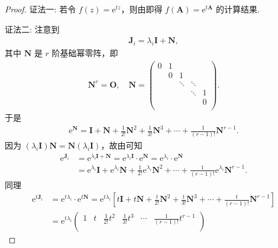 \documentclass[../../main.tex]{subfiles}
\begin{document}
\begin{proof}
{\color{blue}证法一:}
若令 $f(z)=\mathrm{e}^{tz}$，则由即得 $f(\boldsymbol{A}) = \mathrm{e}^{t\boldsymbol{A}}$ 的计算结果. 

{\color{blue}证法二:}
注意到
\begin{align*}
\boldsymbol{J}_i=\lambda_i\boldsymbol{I}+\boldsymbol{N},
\end{align*}
其中 $\boldsymbol{N}$ 是 $r$ 阶基础幂零阵，即
\begin{align*}
\boldsymbol{N}^r=\boldsymbol{O},\quad \boldsymbol{N}=\left( \begin{matrix}
0&		1&		&		&		\\
&		0&		1&		&		\\
&		&		\ddots&		\ddots&		\\
&		&		&		\ddots&		1\\
&		&		&		&		0\\
\end{matrix} \right) .
\end{align*}
于是
\begin{align*}
\mathrm{e}^{\boldsymbol{N}}=\boldsymbol{I}+\boldsymbol{N}+\frac{1}{2!}\boldsymbol{N}^2+\frac{1}{3!}\boldsymbol{N}^3+\cdots+\frac{1}{(r - 1)!}\boldsymbol{N}^{r - 1}.
\end{align*}
因为 $(\lambda_i\boldsymbol{I})\boldsymbol{N}=\boldsymbol{N}(\lambda_i\boldsymbol{I})$，故由可知
\begin{align*}
\mathrm{e}^{\boldsymbol{J}_i}&=\mathrm{e}^{\lambda_i\boldsymbol{I}+\boldsymbol{N}}=\mathrm{e}^{\lambda_i\boldsymbol{I}}\cdot\mathrm{e}^{\boldsymbol{N}}=\mathrm{e}^{\lambda_i}\cdot\mathrm{e}^{\boldsymbol{N}}\\
&=\mathrm{e}^{\lambda_i}\boldsymbol{I}+\mathrm{e}^{\lambda_i}\boldsymbol{N}+\frac{1}{2!}\mathrm{e}^{\lambda_i}\boldsymbol{N}^2+\cdots+\frac{1}{(r - 1)!}\mathrm{e}^{\lambda_i}\boldsymbol{N}^{r - 1}.
\end{align*}
同理
\begin{align*}
\mathrm{e}^{t\boldsymbol{J}_i}&=\mathrm{e}^{t\lambda_i}\cdot\mathrm{e}^{t\boldsymbol{N}}=\mathrm{e}^{t\lambda _i}\left[ t\boldsymbol{I}+t\boldsymbol{N}+\frac{t}{2!}\boldsymbol{N}^2+\frac{t}{3!}\boldsymbol{N}^3+\cdots +\frac{t}{(r-1)!}\boldsymbol{N}^{r-1} \right] 
\\
&=\mathrm{e}^{t\lambda_i}
\begin{pmatrix}
1 & t & \frac{1}{2!}t^2 & \frac{1}{3!}t^3 & \cdots & \frac{1}{(r - 1)!}t^{r - 1} \\

\end{pmatrix}
\end{align*}
\end{proof}
\end{document}
